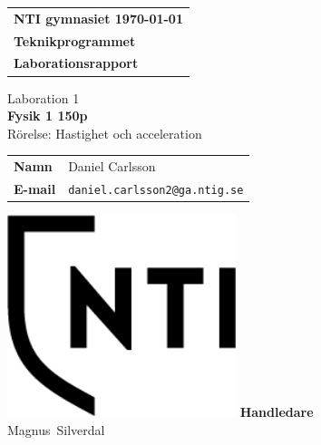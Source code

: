 \documentclass[11p, titlepage, oneside, a4paper]{article}
\makeatletter
\def\inst{Teknikprogrammet}
\def\typeofdoc{Laborationsrapport}
\def\course{Fysik 1 150p}
\def\pretitle{Laboration 1}
\def\title{Rörelse: Hastighet och acceleration}
\def\name{Daniel Carlsson}
\def\username{daniel.carlsson2}
\def\email{\username{}@ga.ntig.se}
\def\graders{Magnus Silverdal}
\makeatother
\begin{document}
\begin{titlepage}
		\thispagestyle{empty}		\begin{large}
			\begin{tabular}{@{}p{\textwidth}@{}}
				\textbf{NTI gymnasiet \hfill \today} \\
				\textbf{\inst} \\
				\textbf{\typeofdoc} \\
			\end{tabular}
		\end{large}
		\vspace{10mm}
		\begin{center}
			\LARGE{\pretitle} \\
			\huge{\textbf{\course}}\\
			\vspace{10mm}
			\LARGE{\title} \\
			\vspace{15mm}
			\begin{large}
				\begin{tabular}{ll}
					\textbf{Namn} & \name \\
					\textbf{E-mail} & \texttt{\email} \\
				\end{tabular}
			\end{large}
			\vfill
            \includegraphics[width=0.5\textwidth]{images/NTI Gymnasiet_Symbol_print_svart.png}
			\vfill
            \large{\textbf{Handledare}}\\
			\mbox{\large{\graders}}
		\end{center}
	\end{titlepage}

    \begin{otherlanguage}{english}
	\begin{abstract}
        This report log is about a physics experiment done at NTI Gymnasiet Umeå. The student in question is me, Daniel Carlsson. During this test, we as a class have analysed and studied the movement of a cart. To aid us we used a tool called "". Its purpose is to take pictures of a moving object and calculate its acceleration speed. Which would speed up our progress. Additionally, this program was able to take pictures in a rapid pace getting us a lot of measurement data. Which can be found later in this report log. Without needing to calculate and repeating the test to get enough data we had ourself a more accurate and easy graph in Mircosoft Excel.
    \end{abstract}
    \end{otherlanguage}
	\tableofcontents
	
\end{document}
